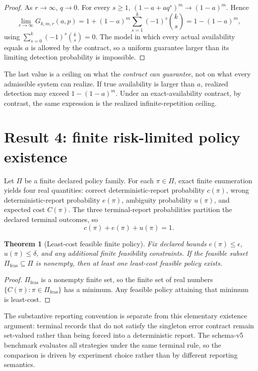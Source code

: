 \documentclass[11pt]{article}
\newtheorem{theorem}{Theorem}
\begin{document}
\begin{proof}
As $r\to\infty$, $q\to0$. For every $s\ge1$, $(1-a+a q^s)^m\to(1-a)^m$. Hence
\[
\lim_{r\to\infty}G_{k,m,r}(a,p)
=1+(1-a)^m\sum_{s=1}^{k}(-1)^s{k\choose s}
=1-(1-a)^m,
\]
using $\sum_{s=0}^{k}(-1)^s{k\choose s}=0$. The model in which every actual availability equals $a$ is allowed by the contract, so a uniform guarantee larger than its limiting detection probability is impossible.
\end{proof}

The last value is a ceiling on what the \emph{contract can guarantee}, not on what every admissible system can realize. If true availability is larger than $a$, realized detection may exceed $1-(1-a)^m$. Under an exact-availability contract, by contrast, the same expression is the realized infinite-repetition ceiling.

\section{Result 4: finite risk-limited policy existence}
Let $\Pi$ be a finite declared policy family. For each $\pi\in\Pi$, exact finite enumeration yields four real quantities: correct deterministic-report probability $c(\pi)$, wrong deterministic-report probability $e(\pi)$, ambiguity probability $u(\pi)$, and expected cost $C(\pi)$. The three terminal-report probabilities partition the declared terminal outcomes, so
\[
c(\pi)+e(\pi)+u(\pi)=1.
\]

\begin{theorem}[Least-cost feasible finite policy]
Fix declared bounds $e(\pi)\le\epsilon$, $u(\pi)\le\delta$, and any additional finite feasibility constraints. If the feasible subset $\Pi_{\mathrm{feas}}\subseteq\Pi$ is nonempty, then at least one least-cost feasible policy exists.
\end{theorem}

\begin{proof}
$\Pi_{\mathrm{feas}}$ is a nonempty finite set, so the finite set of real numbers $\{C(\pi):\pi\in\Pi_{\mathrm{feas}}\}$ has a minimum. Any feasible policy attaining that minimum is least-cost.
\end{proof}

The substantive reporting convention is separate from this elementary existence argument: terminal records that do not satisfy the singleton error contract remain set-valued rather than being forced into a deterministic report. The schema-v5 benchmark evaluates all strategies under the same terminal rule, so the comparison is driven by experiment choice rather than by different reporting semantics.
\end{document}

